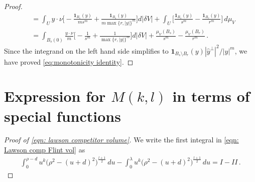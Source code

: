 \documentclass[10pt,reqno]{amsart}
\numberwithin{equation}{section}
\theoremstyle{definition}
\begin{document}
{{\begin{proof}
\begin{align}
    &= \int_Uy \cdot \nu\bigg[-\frac{\mathbf{1}_{B_s}(y)}{ms^m} + \frac{\mathbf{1}_{B_s}(y)}{m\max\{r,|y|\}^m}\bigg] d|\delta V| + \int_U \bigg[\frac{\mathbf{1}_{B_s}(y)}{s^m}-\frac{\mathbf{1}_{B_r}(y)}{r^m}\bigg]\,d\mu_V \\ \label{eq:radial test 7}
    &= \int_{B_s(0)} \frac{y \cdot \nu}{m}\bigg[-\frac{1}{s^m} + \frac{1}{\max\{r,|y|\}^m}\bigg] d|\delta V| + \frac{\mu_V(B_s)}{s^m} - \frac{\mu_V(B_r)}{r^m}\,.
\end{align}
Since the integrand on the left hand side simplifies to $\mathbf{1}_{B_s\setminus B_r}(y)|\hat y^\perp|^2 / |y|^m$, we have proved \eqref{eq:monotonicity identity}.
\end{proof}


\section{Expression for \texorpdfstring{$M(k,l)$}{Mkl} in terms of special functions}\label{app: special functions}
\begin{proof}[Proof of \eqref{eqn: lawson competitor volume}]
We write the first integral in  \eqref{eqn: Lawson comp Flint vol} as
\begin{align} \label{eqn: term I and term II}
    \int_0^{\rho-d} u^k \big(\rho^2 -(u+d)^2\big)^{\frac{l+1}{2}} \,du -
    \int_0^\lambda u^k \big(\rho^2 -(u+d)^2\big)^{\frac{l+1}{2}} \,du = I - II\,.
\end{align}

\end{proof}}}
\end{document}
